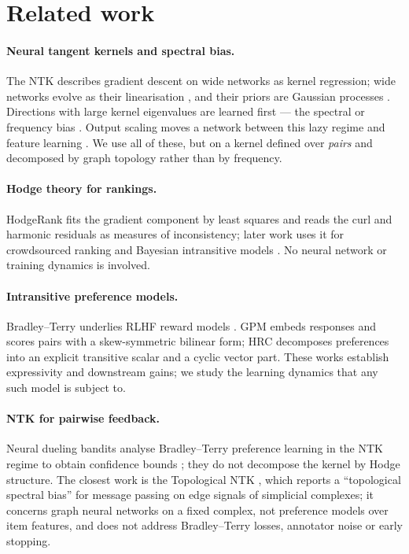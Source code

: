 \section{Related work}
\label{sec:related}

\paragraph{Neural tangent kernels and spectral bias.} The NTK
\cite{jacot2018neural} describes gradient descent on wide networks as kernel
regression; wide networks evolve as their linearisation \cite{lee2019wide},
and their priors are Gaussian processes \cite{neal1996bayesian, lee2018deep}.
Directions with large kernel eigenvalues are learned first --- the spectral or
frequency bias \cite{rahaman2019spectral}. Output scaling moves a network
between this lazy regime and feature learning \cite{chizat2019lazy}. We use
all of these, but on a kernel defined over \emph{pairs} and decomposed by
graph topology rather than by frequency.

\paragraph{Hodge theory for rankings.} HodgeRank
\cite{jiang2011statistical} fits the gradient component by least squares and
reads the curl and harmonic residuals as measures of inconsistency; later work
uses it for crowdsourced ranking and Bayesian intransitive models
\cite{xu2018hodgerank}. No neural network or training dynamics is involved.

\paragraph{Intransitive preference models.} Bradley--Terry
\cite{bradley1952rank} underlies RLHF reward models \cite{ouyang2022training}.
GPM \cite{zhang2025beyond} embeds responses and scores pairs with a
skew-symmetric bilinear form; HRC \cite{hrc2026transitivity} decomposes
preferences into an explicit transitive scalar and a cyclic vector part. These
works establish expressivity and downstream gains; we study the learning
dynamics that any such model is subject to.

\paragraph{NTK for pairwise feedback.} Neural dueling bandits analyse
Bradley--Terry preference learning in the NTK regime to obtain confidence
bounds \cite{verma2024neural}; they do not decompose the kernel by Hodge
structure. The closest work is the Topological NTK \cite{krishnagopal2026topological},
which reports a ``topological spectral bias'' for message passing on edge
signals of simplicial complexes; it concerns graph neural networks on a fixed
complex, not preference models over item features, and does not address
Bradley--Terry losses, annotator noise or early stopping.
